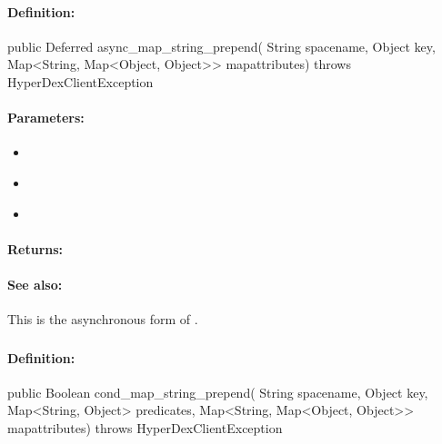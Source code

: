 \paragraph{Definition:}
\begin{javacode}
public Deferred async_map_string_prepend(
        String spacename,
        Object key,
        Map<String, Map<Object, Object>> mapattributes) throws HyperDexClientException
\end{javacode}

\paragraph{Parameters:}
\begin{itemize}[noitemsep]
\item {}\\

\item {}\\

\item {}\\

\end{itemize}

\paragraph{Returns:}


\paragraph{See also:}  This is the asynchronous form of .

\pagebreak
\subsubsection{}
\label{api:java:cond_map_string_prepend}


\paragraph{Definition:}
\begin{javacode}
public Boolean cond_map_string_prepend(
        String spacename,
        Object key,
        Map<String, Object> predicates,
        Map<String, Map<Object, Object>> mapattributes) throws HyperDexClientException
\end{javacode}

